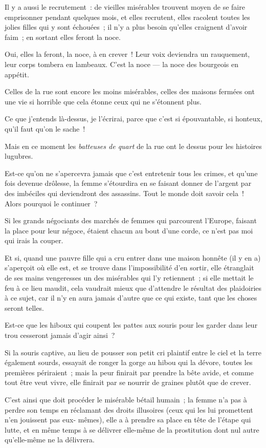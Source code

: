 \documentclass[french,twoside]{book} %
\begin{document}
Il y a aussi le recrutement : de vieilles misérables trouvent moyen de se faire emprisonner pendant quelques mois, et elles recrutent, elles racolent toutes les jolies filles qui y sont échouées ; il n’y a plus besoin qu’elles craignent d’avoir faim ; en sortant elles feront la noce.\par
Oui, elles la feront, la noce, à en crever ! Leur voix deviendra un rauquement, leur corps tombera en lambeaux. C’est la noce — la noce des bourgeois en appétit.\par
Celles de la rue sont encore les moins misérables, celles des maisons fermées ont une vie si horrible que cela étonne ceux qui ne s’étonnent plus.\par
Ce que j’entends là-dessus, je l’écrirai, parce que c’est si épouvantable, si honteux, qu’il faut qu’on le sache !\par
Mais en ce moment les \emph{batteuses de quart} de la rue ont le dessus pour les histoires lugubres.\par
Est-ce qu’on ne s’apercevra jamais que c’est entretenir tous les crimes, et qu’une fois devenue drôlesse, la femme s’étourdira en se faisant donner de l’argent par des imbéciles qui deviendront des assassins. Tout le monde doit savoir cela ! Alors pourquoi le continuer ?\par
 Si les grands négociants des marchés de femmes qui parcourent l’Europe, faisant la place pour leur négoce, étaient chacun au bout d’une corde, ce n’est pas moi qui irais la couper.\par
Et si, quand une pauvre fille qui a cru entrer dans une maison honnête (il y en a) s’aperçoit où elle est, et se trouve dans l’impossibilité d’en sortir, elle étranglait de ses mains vengeresses un des misérables qui l’y retiennent ; si elle mettait le feu à ce lieu maudit, cela vaudrait mieux que d’attendre le résultat des plaidoiries à ce sujet, car il n’y en aura jamais d’autre que ce qui existe, tant que les choses seront telles.\par
Est-ce que les hiboux qui coupent les pattes aux souris pour les garder dans leur trou cesseront jamais d’agir ainsi ?\par
Si la souris captive, au lieu de pousser son petit cri plaintif entre le ciel et la terre également sourds, essayait de ronger la gorge au hibou qui la dévore, toutes les premières périraient ; mais la peur finirait par prendre la bête avide, et comme tout être veut vivre, elle finirait par se nourrir de graines plutôt que de crever.\par
C’est ainsi que doit procéder le misérable bétail humain ; la femme n’a pas à perdre son temps en réclamant des droits illusoires (ceux qui les lui promettent n’en jouissent pas eux- mêmes), elle a à prendre sa place en tête de l’étape qui lutte, et en même temps à se délivrer elle-même de la prostitution dont nul autre qu’elle-même ne la délivrera.\par
\end{document}
